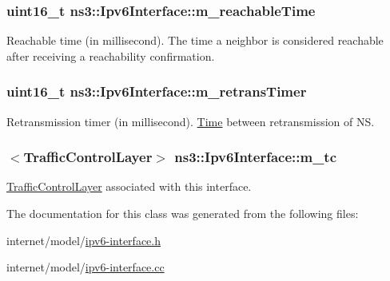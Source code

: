 \subsubsection[{\texorpdfstring{m\+\_\+reachable\+Time}{m_reachableTime}}]{\setlength{\rightskip}{0pt plus 5cm}uint16\+\_\+t ns3\+::\+Ipv6\+Interface\+::m\+\_\+reachable\+Time\hspace{0.3cm}{\ttfamily [private]}}\hypertarget{classns3_1_1Ipv6Interface_a6a7a1c15533b9a58a66a9a5a8f611115}{}\label{classns3_1_1Ipv6Interface_a6a7a1c15533b9a58a66a9a5a8f611115}


Reachable time (in millisecond). The time a neighbor is considered reachable after receiving a reachability confirmation. 

\subsubsection[{\texorpdfstring{m\+\_\+retrans\+Timer}{m_retransTimer}}]{\setlength{\rightskip}{0pt plus 5cm}uint16\+\_\+t ns3\+::\+Ipv6\+Interface\+::m\+\_\+retrans\+Timer\hspace{0.3cm}{\ttfamily [private]}}\hypertarget{classns3_1_1Ipv6Interface_aa114f456af3d6d0562b2a9f690a6af19}{}\label{classns3_1_1Ipv6Interface_aa114f456af3d6d0562b2a9f690a6af19}


Retransmission timer (in millisecond). \hyperlink{classns3_1_1Time}{Time} between retransmission of NS. 

\subsubsection[{\texorpdfstring{m\+\_\+tc}{m_tc}}]{$<${\bf Traffic\+Control\+Layer}$>$ ns3\+::\+Ipv6\+Interface\+::m\+\_\+tc\hspace{0.3cm}{\ttfamily [private]}}\hypertarget{classns3_1_1Ipv6Interface_ac47709de8ca8349e4275f9f074886729}{}\label{classns3_1_1Ipv6Interface_ac47709de8ca8349e4275f9f074886729}


\hyperlink{classns3_1_1TrafficControlLayer}{Traffic\+Control\+Layer} associated with this interface. 



The documentation for this class was generated from the following files\+:\begin{DoxyCompactItemize}
\item 
internet/model/\hyperlink{ipv6-interface_8h}{ipv6-\/interface.\+h}\item 
internet/model/\hyperlink{ipv6-interface_8cc}{ipv6-\/interface.\+cc}\end{DoxyCompactItemize}
